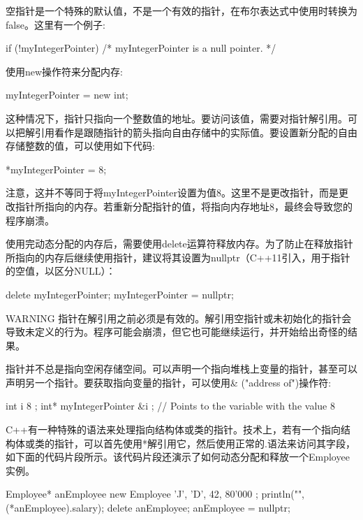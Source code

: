 空指针是一个特殊的默认值，不是一个有效的指针，在布尔表达式中使用时转换为false。这里有一个例子:

\begin{cpp}
if (!myIntegerPointer) { /* myIntegerPointer is a null pointer. */ }
\end{cpp}

使用new操作符来分配内存:

\begin{cpp}
myIntegerPointer = new int;
\end{cpp}

这种情况下，指针只指向一个整数值的地址。要访问该值，需要对指针解引用。可以把解引用看作是跟随指针的箭头指向自由存储中的实际值。要设置新分配的自由存储整数的值，可以使用如下代码:

\begin{cpp}
*myIntegerPointer = 8;
\end{cpp}

注意，这并不等同于将myIntegerPointer设置为值8。这里不是更改指针，而是更改指针所指向的内存。若重新分配指针的值，将指向内存地址8，最终会导致您的程序崩溃。

使用完动态分配的内存后，需要使用delete运算符释放内存。为了防止在释放指针所指向的内存后继续使用指针，建议将其设置为nullptr（C++11引入，用于指针的空值，以区分NULL）：

\begin{cpp}
delete myIntegerPointer;
myIntegerPointer = nullptr;
\end{cpp}

\begin{myWarning}{WARNING}
指针在解引用之前必须是有效的。解引用空指针或未初始化的指针会导致未定义的行为。程序可能会崩溃，但它也可能继续运行，并开始给出奇怪的结果。
\end{myWarning}

指针并不总是指向空闲存储空间。可以声明一个指向堆栈上变量的指针，甚至可以声明另一个指针。要获取指向变量的指针，可以使用\& ("address of")操作符:

\begin{cpp}
int i { 8 };
int* myIntegerPointer { &i }; // Points to the variable with the value 8
\end{cpp}

C++有一种特殊的语法来处理指向结构体或类的指针。技术上，若有一个指向结构体或类的指针，可以首先使用*解引用它，然后使用正常的.语法来访问其字段，如下面的代码片段所示。该代码片段还演示了如何动态分配和释放一个Employee实例。

\begin{cpp}
Employee* anEmployee { new Employee { 'J', 'D', 42, 80'000 } };
println("{}", (*anEmployee).salary);
delete anEmployee; anEmployee = nullptr;
\end{cpp}

